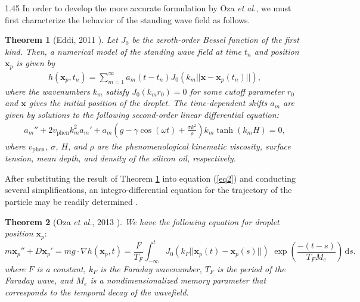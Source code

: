 \documentclass[12pt,titlepage]{article}
\newtheorem{theorem}{Theorem}[section] %
\theoremstyle{definition}
\theoremstyle{remark}
\newcommand{\M}[1]{\mathbf{#1}}
\begin{document}
\begin{spacing}{1.45}
In order to develop the more accurate formulation by Oza \textit{et al.}, we must first characterize the behavior of the standing wave field as follows.

\begin{theorem}[Eddi, 2011 \cite{eddi2011information}]
\label{eddi_wave_faraday}
    Let $J_0$ be the zeroth-order Bessel function of the first kind. Then, a numerical model of the standing wave field at time $t_n$ and position $\M{x}_p$ is given by
\begin{align}
\label{wavefield}
    h(\M{x}_p, t_n) = \sum_{m = 1}^{\infty} a_m (t - t_n) J_0(k_m ||\M{x} - \M{x}_p(t_n)||),
\end{align}
where the wavenumbers $k_m$ satisfy $J_0(k_mr_0) = 0$ for some cutoff parameter $r_0$ and $\M{x}$ gives the initial position of the droplet. The time-dependent shifts $a_m$ are given by solutions to the following second-order linear differential equation:
\begin{align*}
    a_m'' + 2v_{\text{phen}}k_m^2a_m' + a_m \left(g - \gamma \cos(\omega t) + \frac{\sigma k^2}{\rho} \right) k_m \tanh(k_mH) = 0,
\end{align*}
where $v_{\text{phen}}$, $\sigma$, $H$, and $\rho$ are the phenomenological kinematic viscosity, surface tension, mean depth, and density of the silicon oil, respectively. 
\end{theorem}

After substituting the result of Theorem \ref{eddi_wave_faraday} into equation (\ref{eq2}) and conducting several simplifications, an integro-differential equation for the trajectory of the particle may be readily determined \cite{oza2013trajectory, molavcek2013drops}.
\begin{theorem}[Oza \textit{et al.}, 2013 \cite{oza2013trajectory}]
     We have the following equation for droplet position $\M{x}_p\mathrm{:}$
\begin{equation}
\label{intdiff}
    m\M{x}_p'' + D\M{x}_p' = mg \cdot \nabla h(\M{x}_p, t) = \frac{F}{T_F} \int_{-\infty}^{t}  J_0(k_F ||\M{x}_p(t) - \M{x}_p(s)||) \, \,  {\exp \left( \frac{-(t-s)}{T_FM_e} \right)} \, \mathrm{d}s.
\end{equation}
where $F$ is a constant, $k_F$ is the Faraday wavenumber, $T_F$ is the period of the Faraday wave, and $M_{e}$ is a nondimensionalized memory parameter that corresponds to the temporal decay of the wavefield.
\end{theorem}


\end{spacing}
\end{document}
